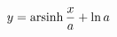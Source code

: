 \documentclass[preview]{standalone}
\begin{document}
\begin{align*}
\special{dvisvgm:raw <g id='unique000'>}y=\operatorname{arsinh}\dfrac{x}{a}+\ln a\special{dvisvgm:raw </g>}
\end{align*}
\end{document}
